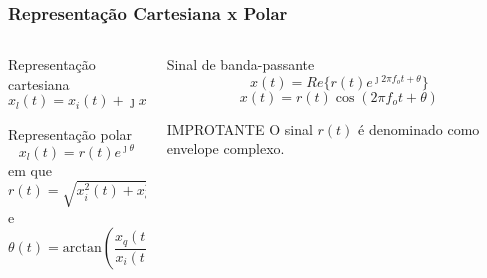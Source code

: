 \documentclass[10pt,hyperref={pdfpagemode=FullScreen},aspectratio=169]{beamer}
\begin{document}
\begin{frame}
  \frametitle{ Representação Cartesiana x Polar}


  \begin{columns}[T]
    \begin{column}{0.5\textwidth}
      \begin{block}{Representação cartesiana}
        $$
        x_l(t) = x_i(t) + \jmath x_q(t)
       $$
       \end{block}
     
       \begin{block}{Representação polar}
         $$
      x_l(t) = r(t) e^{\jmath \theta}
      $$
      em que 
      $$
      r(t) = \sqrt{x^2_i(t) + x^2_q(t)}
      $$
      e
      $$
      \theta (t) = \textrm{arctan}{\left( \frac{x_q(t)}{x_i(t)} \right)}
      $$
       \end{block}
    \end{column}
    \begin{column}{0.5\textwidth}
      \begin{block}{Sinal de banda-passante}
        $$
    x(t) = Re\{r(t)e^{\jmath 2\pi f_o t + \theta}\}
    $$
    $$
    x(t)  =  r(t)\cos(2\pi f_o t + \theta)
    $$
      \end{block}

      \begin{block}{IMPROTANTE}
        O sinal $r(t)$ é denominado como envelope complexo.
        
      \end{block}
    \end{column}
    \end{columns}

  

  
\end{frame}
\end{document}

